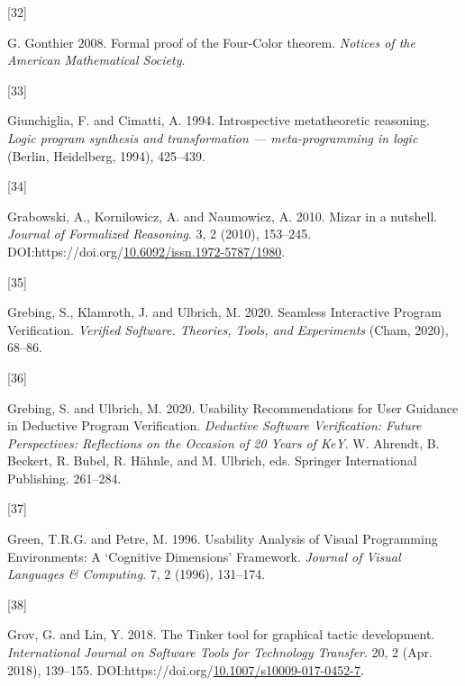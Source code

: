 \documentclass[
]{article}
\newlength{\cslhangindent}
\newlength{\csllabelwidth}
\newlength{\cslentryspacingunit} %
\newenvironment{CSLReferences}[2] %
 {%
  \setlength{\parindent}{0pt}
  \ifodd #1
  \let\oldpar\par
  \def\par{\hangindent=\cslhangindent\oldpar}
  \fi
  \setlength{\parskip}{#2\cslentryspacingunit}
 }%
 {}
\newcommand{\CSLLeftMargin}[1]{\parbox[t]{\csllabelwidth}{#1}}
\newcommand{\CSLRightInline}[1]{\parbox[t]{\linewidth - \csllabelwidth}{#1}\break}
\begin{document}
\begin{CSLReferences}{0}{0}
\leavevmode{}%
\CSLLeftMargin{{[}32{]} }
\CSLRightInline{G. Gonthier 2008. {Formal proof of the Four-Color
theorem}. \emph{{Notices of the American Mathematical Society}}.}

\leavevmode{}%
\CSLLeftMargin{{[}33{]} }
\CSLRightInline{Giunchiglia, F. and Cimatti, A. 1994. Introspective
metatheoretic reasoning. \emph{Logic program synthesis and
transformation --- meta-programming in logic} (Berlin, Heidelberg,
1994), 425--439.}

\leavevmode{}%
\CSLLeftMargin{{[}34{]} }
\CSLRightInline{Grabowski, A., Kornilowicz, A. and Naumowicz, A. 2010.
Mizar in a nutshell. \emph{Journal of Formalized Reasoning}. 3, 2
(2010), 153--245.
DOI:https://doi.org/\href{https://doi.org/10.6092/issn.1972-5787/1980}{10.6092/issn.1972-5787/1980}.}

\leavevmode{}%
\CSLLeftMargin{{[}35{]} }
\CSLRightInline{Grebing, S., Klamroth, J. and Ulbrich, M. 2020. Seamless
{Interactive} {Program} {Verification}. \emph{Verified {Software}.
{Theories}, {Tools}, and {Experiments}} (Cham, 2020), 68--86.}

\leavevmode{}%
\CSLLeftMargin{{[}36{]} }
\CSLRightInline{Grebing, S. and Ulbrich, M. 2020. Usability
{Recommendations} for {User} {Guidance} in {Deductive} {Program}
{Verification}. \emph{Deductive {Software} {Verification}: {Future}
{Perspectives}: {Reflections} on the {Occasion} of 20 {Years} of {KeY}}.
W. Ahrendt, B. Beckert, R. Bubel, R. Hähnle, and M. Ulbrich, eds.
Springer International Publishing. 261--284.}

\leavevmode{}%
\CSLLeftMargin{{[}37{]} }
\CSLRightInline{Green, T.R.G. and Petre, M. 1996. Usability {Analysis}
of {Visual} {Programming} {Environments}: {A} {`{Cognitive}
{Dimensions}'} {Framework}. \emph{Journal of Visual Languages \&
Computing}. 7, 2 (1996), 131--174.}

\leavevmode{}%
\CSLLeftMargin{{[}38{]} }
\CSLRightInline{Grov, G. and Lin, Y. 2018. The {Tinker} tool for
graphical tactic development. \emph{International Journal on Software
Tools for Technology Transfer}. 20, 2 (Apr. 2018), 139--155.
DOI:https://doi.org/\href{https://doi.org/10.1007/s10009-017-0452-7}{10.1007/s10009-017-0452-7}.}


\end{CSLReferences}
\end{document}

